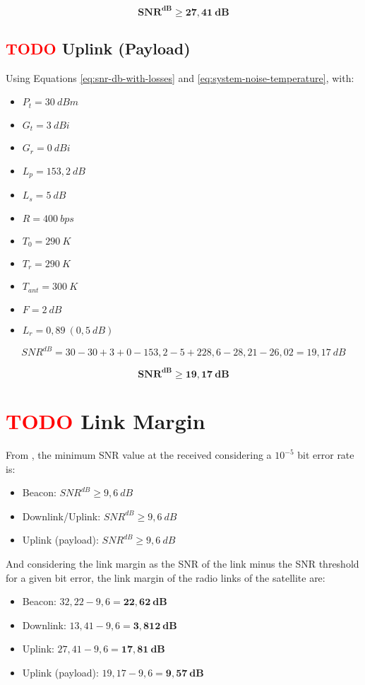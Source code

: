 \begin{equation}
    \mathbf{SNR^{dB} \geq 27,41\ dB}
\end{equation}

\subsection{ \textcolor{red}{TODO} Uplink (Payload)}

Using Equations \ref{eq:snr-db-with-losses} and \ref{eq:system-noise-temperature}, with:

\begin{itemize}
    \item $P_{t} = 30\ dBm$
    \item $G_{t} = 3\ dBi$
    \item $G_{r} = 0\ dBi$
    \item $L_{p} = 153,2\ dB$
    \item $L_{s} = 5\ dB$
    \item $R = 400\ bps$
    \item $T_{0} = 290\ K$
    \item $T_{r} = 290\ K$
    \item $T_{ant} = 300\ K$
    \item $F = 2\ dB$
    \item $L_{r} = 0,89\ (0,5\ dB)$
\end{itemize}

\begin{equation}
    SNR^{dB} = 30 - 30 + 3 + 0 - 153,2 - 5 + 228,6 - 28,21 - 26,02 = 19,17\ dB
\end{equation}

\begin{equation}
    \mathbf{SNR^{dB} \geq 19,17\ dB}
\end{equation}

\section{ \textcolor{red}{TODO} Link Margin}

From \cite{larson2005}, the minimum SNR value at the received considering a $10^{-5}$ bit error rate is:

\begin{itemize}
    \item Beacon: $SNR^{dB} \geq 9,6\ dB$
    \item Downlink/Uplink: $SNR^{dB} \geq 9,6\ dB$
    \item Uplink (payload): $SNR^{dB} \geq 9,6\ dB$
\end{itemize}

And considering the link margin as the SNR of the link minus the SNR threshold for a given bit error, the link margin of the radio links of the satellite are:

\begin{itemize}
    \item Beacon: $32,22 - 9,6 = \mathbf{22,62\ dB}$
    \item Downlink: $13,41 - 9,6 = \mathbf{3,812\ dB}$
    \item Uplink: $27,41 - 9,6 = \mathbf{17,81\ dB}$
    \item Uplink (payload): $19,17 - 9,6 = \mathbf{9,57\ dB}$
\end{itemize}
